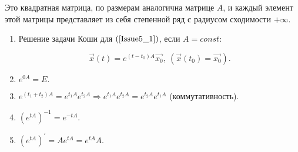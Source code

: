 Это квадратная матрица, по размерам аналогична матрице $A$, и каждый элемент этой матрицы представляет из себя степенной ряд с радиусом сходимости $+\infty$.

\begin{enumerate}
		\item Решение задачи Коши для $(\ref{Issue5_1})$, если $A = const$:

		\begin{equation*} 
			\vec{x}(t) = e^{(t-t_0)A}\vec{x_0},\ (\vec{x}(t_0) = \vec{x_0}) .
		\end{equation*}
		
		\item $ e^{0 A} = E.$
		
		\item $e^{(t_1+t_2)A} = e^{t_1A}e^{t_2A} \Rightarrow e^{t_1A}e^{t_2A} = e^{t_2A}e^{t_1A}$ (коммутативность).
		
		\item $\left(e^{tA}\right)^{-1} = e^{-tA}.$
		
		\item $(e^{tA})^{'} = A e^{tA} = e^{tA}A.$

\end{enumerate}

